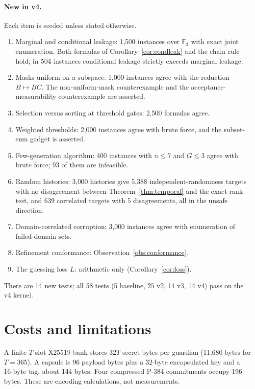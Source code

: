 \documentclass[pdflatex,sn-mathphys-num]{sn-jnl}
\theoremstyle{plain}
\theoremstyle{definition}
\newcommand{\F}{\mathbb{F}}
\begin{document}
\paragraph{New in v4.}
Each item is seeded unless stated otherwise.
\begin{enumerate}
\item Marginal and conditional leakage: 1,500 instances over $\F_3$ with exact joint enumeration. Both formulas of Corollary~\ref{cor:condleak} and the chain rule hold; in 504 instances conditional leakage strictly exceeds marginal leakage.
\item Masks uniform on a subspace: 1,000 instances agree with the reduction $B\mapsto BC$. The non-uniform-mask counterexample and the acceptance-measurability counterexample are asserted.
\item Selection versus sorting at threshold gates: 2,500 formulas agree.
\item Weighted thresholds: 2,000 instances agree with brute force, and the subset-sum gadget is asserted.
\item Few-generation algorithm: 400 instances with $n\le7$ and $G\le3$ agree with brute force; 93 of them are infeasible.
\item Random histories: 3,000 histories give 5,388 independent-randomness targets with no disagreement between Theorem~\ref{thm:temporal} and the exact rank test, and 639 correlated targets with 5 disagreements, all in the unsafe direction.
\item Domain-correlated corruption: 3,000 instances agree with enumeration of failed-domain sets.
\item Refinement conformance: Observation~\ref{obs:conformance}.
\item The guessing loss $L$: arithmetic only (Corollary~\ref{cor:loss}).
\end{enumerate}
There are 14 new tests; all 58 tests (5 baseline, 25 v2, 14 v3, 14 v4) pass on the v4 kernel.


\section{Costs and limitations}\label{sec:limits}

A finite $T$-slot X25519 bank stores $32T$ secret bytes per guardian (11,680 bytes for $T=365$). A capsule is 96 payload bytes plus a 32-byte encapsulated key and a 16-byte tag, about 144 bytes. Four compressed P-384 commitments occupy 196 bytes. These are encoding calculations, not measurements.
\end{document}
